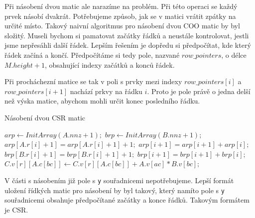 \label{alg:coo-mmm}
Při násobení dvou matic ale narazíme na problém. Při této operaci se každý prvek násobí dvakrát. Potřebujeme způsob, jak se v matici vrátit zpátky na určité místo. Takový naivní algoritmus pro násobení dvou COO matic by byl složitý. Museli bychom si pamatovat začátky řádků a neustále kontrolovat, jestli jsme nepřesáhli další řádek. Lepším řešením je dopředu si předpočítat, kde který řádek začíná a končí. Předpočítáme si tedy pole, nazvané $row\_pointers$, o délce $M.height + 1$, obsahující indexy začátků a konců řádek.

Při procháchezní matice se tak v poli s prvky mezi indexy $row\_pointers[i]$ a $row\_pointers[i+1]$ nachází prkvy na řádku $i$. Proto je pole právě o jedna delší než výska matice, abychom mohli určit konec posledního řádku.

\begin{algorithm}[H]
	\caption{Násobení dvou CSR matic}\label{coo-mmm}
	\begin{algorithmic}[1]
		\State \texttt{$arp\gets InitArray(A.nnz + 1);$}
		\State \texttt{$brp\gets InitArray(B.nnz + 1);$}
			\State \texttt{$arp[A.r[i]+1] = arp[A.r[i]+1] + 1;$}
		\EndFor
			\State \texttt{$arp[i+1] = arp[i+1] + arp[i];$}
		\EndFor
			\State \texttt{$brp[B.r[i]+1] = brp[B.r[i]+1] + 1;$}
		\EndFor
			\State \texttt{$brp[i+1] = brp[i+1] + brp[i];$}
		\EndFor
					\State \texttt{$C.v[r][A.c[bc]] \gets C.v[r][A.c[bc]] + A.v[ac] * B.v[bc];$}
				\EndFor
			\EndFor
		\EndFor
		\EndProcedure
	\end{algorithmic}
\end{algorithm}

V části s násobením již pole s \texttt{y} souřadnicemi nepotřebujeme. Lepší formát uložení řídkých matic pro násobení by byl takový, který namíto pole s \texttt{y} souřadnicemi obsahuje předpočítané začátky a konce řádků. Takovým formátem je CSR.


